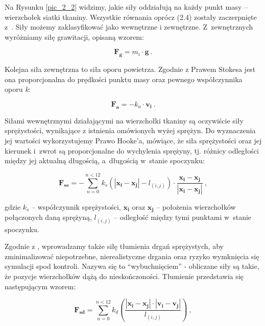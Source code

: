 			
			
			
			Na Rysunku \ref{pic_2_2} widzimy, jakie siły oddziałują na każdy punkt masy -- wierzchołek siatki tkaniny. Wszystkie równania oprócz (2.4) zostały zaczerpnięte z~\cite{cloth-dobre-wzory}. Siły możemy zaklasyfikować jako wewnętrzne i zewnętrzne. Z~zewnętrznych wyróżniamy siłę grawitacji, opisaną wzorem:
			
			\begin{equation}
			\mathbf{F_{g}} = m_{i} \cdot \mathbf{g} \ .
			\end{equation}
			
			Kolejna siła zewnętrzna to siła oporu powietrza. Zgodnie z Prawem Stokesa jest ona proporcjonalna do prędkości punktu masy oraz pewnego współczynnika oporu \emph{k}:
			
			\begin{equation}
			\mathbf{F_{a}} = -k_{a} \cdot \mathbf{v_{i}} \ .
			\end{equation}
			
			Siłami wewnętrznymi działającymi na wierzchołki tkaniny są oczywiście siły sprężystości, wynikające z istnienia omówionych wyżej sprężyn. Do wyznaczenia jej wartości wykorzystujemy Prawo Hooke'a, mówiące, że siła sprężystości oraz jej kierunek i~zwrot są proporcjonalne do wychylenia sprężyny, tj. różnicy odległości między jej aktualną długością, a~długością w~stanie spoczynku:
			
			\begin{equation}
			\mathbf{F_{se}} = - \sum_{n = 0}^{n < 12} k_{s} (|\mathbf{x_{i}} - \mathbf{x_{j}}| - l_{(i, j)}) \cdot \frac{\mathbf{x_{i}} - \mathbf{x_{j}}}{|\mathbf{x_{i}} - \mathbf{x_{j}}|} \ ,
			\end{equation}
			
			gdzie \(k_{s}\) -- współczynnik sprężystości, \(\mathbf{x_{i}}\) oraz \(\mathbf{x_{j}}\) -- położenia wierzchołków połączonych daną sprężyną, \(l_{(i, j)}\) -- odległość między tymi punktami w~stanie spoczynku.
			
			Zgodnie z \cite{receptury}, wprowadzamy także siłę tłumienia drgań sprężystych, aby zminimalizować niepotrzebne, nierealistyczne drgania oraz ryzyko wymknięcia się symulacji spod kontroli. Nazywa się to ``wybuchnięciem'' - obliczane siły są takie, że pozycje wierzchołków dążą do nieskończoności. Tłumienie przedstawia się następującym wzorem:
			
			\begin{equation}
			\mathbf{F_{sd}} = \sum_{n = 0}^{n < 12} k_{d} (\frac{|\mathbf{x_{i}} - \mathbf{x_{j}}| \cdot |\mathbf{v_{i}} - \mathbf{v_{j}}|}{l_{(i, j)}}) \ ,
			\end{equation}
			
